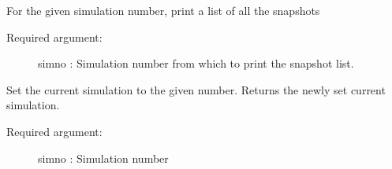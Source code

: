 \documentclass[letterpaper,10pt,english]{sphinxmanual}
\begin{document}

\begin{fulllineitems}
\label{index:facade.snaps}
For the given simulation number, print a list of all the snapshots
\begin{description}
\item[{Required argument:}] \leavevmode
simno      : Simulation number from which to print the snapshot list.

\end{description}

\end{fulllineitems}


\begin{fulllineitems}
\label{index:facade.set_current_sim}
Set the current simulation to the given number.
Returns the newly set current simulation.
\begin{description}
\item[{Required argument:}] \leavevmode
simno      : Simulation number

\end{description}

\end{fulllineitems}

\end{document}
